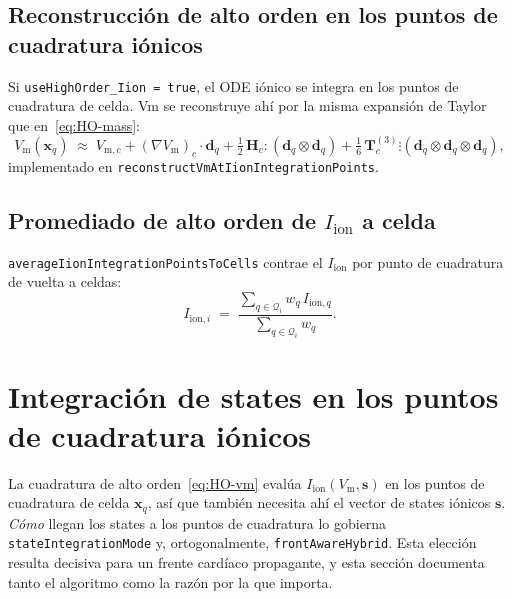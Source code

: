 \documentclass[11pt,a4paper]{article}
\newcommand{\code}[1]{\texttt{\small #1}}
\newcommand{\Vm}{V_{\text{m}}}
\newcommand{\Iion}{I_{\mathrm{ion}}}
\newcommand{\grad}{\nabla}
\newcommand{\Vmsub}[1]{V_{\text{m},#1}}
\newcommand{\Iionsub}[1]{I_{\mathrm{ion},#1}}
\newcommand{\dictkey}[1]{\textcolor{black!60!green}{\texttt{\footnotesize #1}}}
\begin{document}
\subsection{Reconstrucción de alto orden en los puntos de cuadratura iónicos}

Si \code{useHighOrder\_Iion = true}, el ODE iónico se integra en los puntos de
cuadratura de celda. Vm se reconstruye ahí por la misma expansión de Taylor que
en~\eqref{eq:HO-mass}:
\begin{equation}
  \Vm(\mathbf{x}_{q})
   \;\approx\;
   \Vmsub{c} + (\grad \Vm)_{c} \cdot \mathbf{d}_{q}
   + \tfrac{1}{2}\, \mathbf{H}_{c} \!:\! (\mathbf{d}_{q} \otimes \mathbf{d}_{q})
   + \tfrac{1}{6}\, \mathbf{T}^{(3)}_{c} \!\vdots\!
       (\mathbf{d}_{q} \otimes \mathbf{d}_{q} \otimes \mathbf{d}_{q}),
   \label{eq:HO-vm}
\end{equation}
implementado en \code{reconstructVmAtIionIntegrationPoints}.

\subsection{Promediado de alto orden de $\Iion$ a celda}

\code{averageIionIntegrationPointsToCells} contrae el $\Iion$ por punto de
cuadratura de vuelta a celdas:
\begin{equation}
  \Iionsub{i} \;=\;
   \frac{\sum_{q \in \mathcal{Q}_{i}} w_{q}\, \Iionsub{q}}
        {\sum_{q \in \mathcal{Q}_{i}} w_{q}}.
\end{equation}

\section{Integración de states en los puntos de cuadratura iónicos}
\label{sec:stateint}

La cuadratura de alto orden~\eqref{eq:HO-vm} evalúa $\Iion(\Vm,\mathbf{s})$ en los
puntos de cuadratura de celda $\mathbf{x}_q$, así que también necesita ahí el
vector de states iónicos $\mathbf{s}$. \emph{Cómo} llegan los states a los puntos
de cuadratura lo gobierna \dictkey{stateIntegrationMode} y, ortogonalmente,
\dictkey{frontAwareHybrid}. Esta elección resulta decisiva para un frente cardíaco
propagante, y esta sección documenta tanto el algoritmo como la razón por la que
importa.

\end{document}
